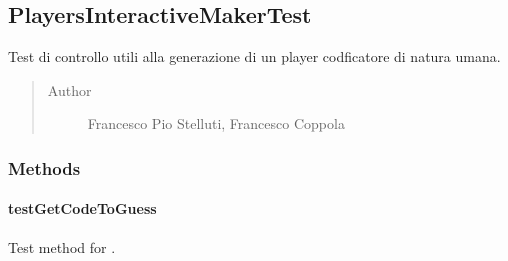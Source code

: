 \documentclass[letterpaper,10pt,italian,openany,oneside]{sphinxmanual}
\begin{document}
\subsection{PlayersInteractiveMakerTest}
\label{\detokenize{test/it/unicam/cs/pa/mastermind/test/PlayersInteractiveMakerTest:playersinteractivemakertest}}\label{\detokenize{test/it/unicam/cs/pa/mastermind/test/PlayersInteractiveMakerTest::doc}}

\begin{fulllineitems}
\label{\detokenize{test/it/unicam/cs/pa/mastermind/test/PlayersInteractiveMakerTest:it.unicam.cs.pa.mastermind.test.PlayersInteractiveMakerTest}}
Test di controllo utili alla generazione di un player codficatore di natura umana.
\begin{quote}\begin{description}
\item[{Author}] \leavevmode
Francesco Pio Stelluti, Francesco Coppola

\end{description}\end{quote}

\end{fulllineitems}



\subsubsection{Methods}
\label{\detokenize{test/it/unicam/cs/pa/mastermind/test/PlayersInteractiveMakerTest:methods}}

\paragraph{testGetCodeToGuess}
\label{\detokenize{test/it/unicam/cs/pa/mastermind/test/PlayersInteractiveMakerTest:testgetcodetoguess}}

\begin{fulllineitems}
\label{\detokenize{test/it/unicam/cs/pa/mastermind/test/PlayersInteractiveMakerTest:it.unicam.cs.pa.mastermind.test.PlayersInteractiveMakerTest.testGetCodeToGuess()}}
Test method for .

\end{fulllineitems}
\end{document}

